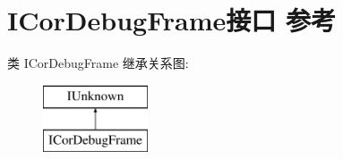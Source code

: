 \hypertarget{interface_i_cor_debug_frame}{}\section{I\+Cor\+Debug\+Frame接口 参考}
\label{interface_i_cor_debug_frame}
类 I\+Cor\+Debug\+Frame 继承关系图\+:\begin{figure}[H]
\begin{center}
\leavevmode
\includegraphics[height=2.000000cm]{interface_i_cor_debug_frame}
\end{center}
\end{figure}
